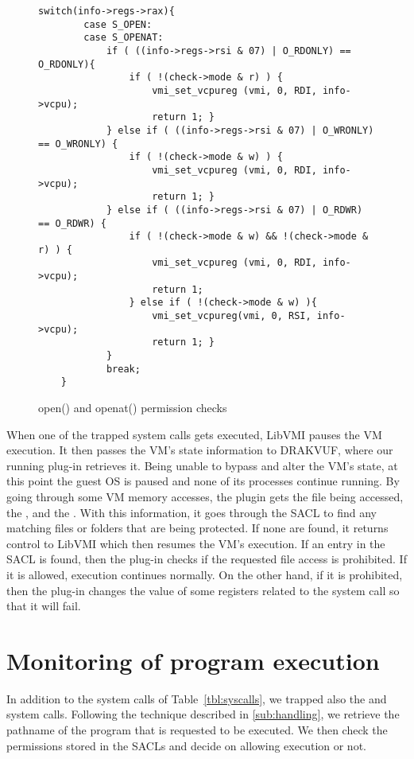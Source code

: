 \begin{figure}[ht!]
\selectfont
\begin{lstlisting}[style=CStyle]
	switch(info->regs->rax){
		case S_OPEN:
		case S_OPENAT:
			if ( ((info->regs->rsi & 07) | O_RDONLY) == O_RDONLY){
				if ( !(check->mode & r) ) {
					vmi_set_vcpureg (vmi, 0, RDI, info->vcpu);
					return 1; }
			} else if ( ((info->regs->rsi & 07) | O_WRONLY) == O_WRONLY) {
				if ( !(check->mode & w) ) {
					vmi_set_vcpureg (vmi, 0, RDI, info->vcpu);
					return 1; }
			} else if ( ((info->regs->rsi & 07) | O_RDWR) == O_RDWR) {
				if ( !(check->mode & w) && !(check->mode & r) ) {
					vmi_set_vcpureg (vmi, 0, RDI, info->vcpu);
					return 1;
				} else if ( !(check->mode & w) ){
					vmi_set_vcpureg(vmi, 0, RSI, info->vcpu);
					return 1; }
			}
			break;
	}
\end{lstlisting}
	\caption{open() and openat() permission checks}
	\label{fig:open}
\end{figure}

\par When one of the trapped system calls gets executed, LibVMI pauses the \ac{VM} execution. It then passes the \ac{VM}'s state information to DRAKVUF, where our running plug-in retrieves it. Being unable to bypass and alter the \ac{VM}'s state, at this point the guest \ac{OS} is paused and none of its processes continue running. By going through some \ac{VM} memory accesses, the plugin gets the file being accessed, the , and the . With this information, it goes through the \ac{SACL} to find any matching files or folders that are being protected. If none are found, it returns control to LibVMI which then resumes the \ac{VM}'s execution. If an entry in the \ac{SACL} is found, then the plug-in checks if the requested file access is prohibited. If it is allowed, execution continues normally. On the other hand, if it is prohibited,  then the plug-in changes the value of some registers related to the system call so that it will fail.


\section{Monitoring of program execution}

\par In addition to the system calls of Table~\ref{tbl:syscalls}, we trapped also the  and  system calls. Following the technique described in \ref{sub:handling}, we retrieve the pathname of the program that is requested to be executed. We then check the permissions stored in the \acp{SACL} and decide on allowing execution or not.

